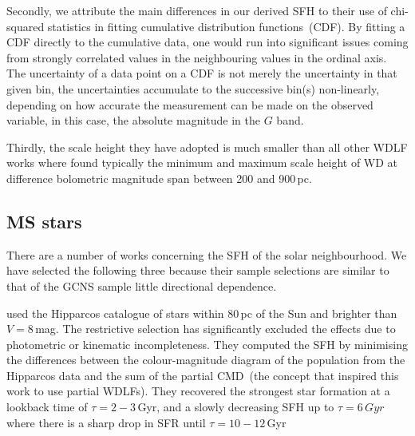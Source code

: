 \documentclass[fleqn,usenatbib]{mnras}
\begin{document}
Secondly, we attribute the main differences in our derived SFH to their
use of chi-squared statistics in fitting cumulative distribution
functions~(CDF). By fitting a CDF directly to the cumulative data, one would
run into significant issues coming from strongly correlated values in the
neighbouring values in the ordinal axis. The uncertainty of a data point on
a CDF is not merely the uncertainty in that given bin, the uncertainties
accumulate to the successive bin(s) non-linearly, depending on how accurate the
measurement can be made on the observed variable, in this case, the absolute
magnitude in the $G$ band.

% 

Thirdly, the scale height they have adopted is much smaller than all other
WDLF works where \citet{2006AJ....131..571H} found typically the minimum
and maximum scale height of WD at difference bolometric magnitude span
between 200 and 900\,pc.

% 


\citet{2019ApJ...878L..11I, 2021MNRAS.502.1753T}

\subsection{MS stars}
There are a number of works concerning the SFH of the solar neighbourhood. We
have selected the following three because their sample selections are similar
to that of the GCNS sample little directional dependence.

\citet{2006A&A...459..783C} used the Hipparcos catalogue of stars within 80\,pc
of the Sun and brighter than $V=8$\,mag. The restrictive selection has
significantly excluded the effects due to photometric or kinematic
incompleteness. They computed the SFH by minimising the differences between the
colour-magnitude diagram of the population from the Hipparcos data and the
sum of the partial CMD~(the concept that inspired this work to use partial
WDLFs). They recovered the strongest star formation at a lookback time of
$\tau=2-3$\,Gyr, and a slowly decreasing SFH up to $\tau=6\,Gyr$ where there is
a sharp drop in SFR until $\tau=10-12$\,Gyr
\end{document}

